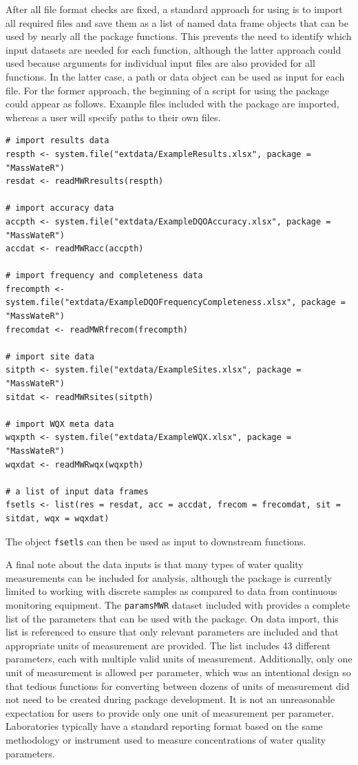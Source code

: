 After all file format checks are fixed, a standard approach for using  is to import all required files and save them as a list of named data frame objects that can be used by nearly all the package functions. This prevents the need to identify which input datasets are needed for each function, although the latter approach could used because arguments for individual input files are also provided for all functions. In the latter case, a path or data object can be used as input for each file. For the former approach, the beginning of a script for using the package could appear as follows. Example files included with the package are imported, whereas a user will specify paths to their own files.

\begin{verbatim}
# import results data
respth <- system.file("extdata/ExampleResults.xlsx", package = "MassWateR")
resdat <- readMWRresults(respth)

# import accuracy data
accpth <- system.file("extdata/ExampleDQOAccuracy.xlsx", package = "MassWateR")
accdat <- readMWRacc(accpth)

# import frequency and completeness data
frecompth <- system.file("extdata/ExampleDQOFrequencyCompleteness.xlsx", package = "MassWateR")
frecomdat <- readMWRfrecom(frecompth)

# import site data
sitpth <- system.file("extdata/ExampleSites.xlsx", package = "MassWateR")
sitdat <- readMWRsites(sitpth)

# import WQX meta data
wqxpth <- system.file("extdata/ExampleWQX.xlsx", package = "MassWateR")
wqxdat <- readMWRwqx(wqxpth)

# a list of input data frames
fsetls <- list(res = resdat, acc = accdat, frecom = frecomdat, sit = sitdat, wqx = wqxdat)
\end{verbatim}

The object \texttt{fsetls} can then be used as input to downstream functions.

A final note about the data inputs is that many types of water quality measurements can be included for analysis, although the package is currently limited to working with discrete samples as compared to data from continuous monitoring equipment. The \texttt{paramsMWR} dataset included with  provides a complete list of the parameters that can be used with the package. On data import, this list is referenced to ensure that only relevant parameters are included and that appropriate units of measurement are provided. The list includes 43 different parameters, each with multiple valid units of measurement. Additionally, only one unit of measurement is allowed per parameter, which was an intentional design so that tedious functions for converting between dozens of units of measurement did not need to be created during package development. It is not an unreasonable expectation for users to provide only one unit of measurement per parameter. Laboratories typically have a standard reporting format based on the same methodology or instrument used to measure concentrations of water quality parameters.


